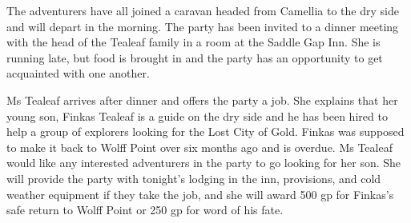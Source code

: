 The adventurers have all joined a caravan headed from Camellia to the dry side and will depart in the morning.
The party has been invited to a dinner meeting with the head of the Tealeaf family in a room at the Saddle Gap Inn.
She is running late, but food is brought in and the party has an opportunity to get acquainted with one another.

Ms Tealeaf arrives after dinner and offers the party a job.
She explains that her young son, Finkas Tealeaf is a guide on the dry side and he has been hired to help a group of explorers looking for the Lost City of Gold.
Finkas was supposed to make it back to Wolff Point over six months ago and is overdue.
Ms Tealeaf would like any interested adventurers in the party to go looking for her son.
She will provide the party with tonight's lodging in the inn, provisions, and cold weather equipment if they take the job, and she will award 500 gp for Finkas's safe return to Wolff Point or 250 gp for word of his fate.
